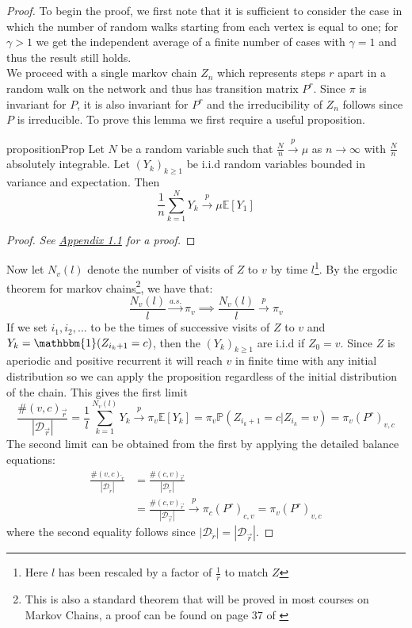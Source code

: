 \documentclass[a4paper]{article}
\renewcommand{\P}{\mathbb P}
\renewcommand{\E}{\mathbb E}
\newcommand{\D}{\mathcal D}
\newcommand{\rar}{\overrightarrow r}
\newcommand{\lar}{\overleftarrow r}
\begin{document}
\begin{proof}
To begin the proof, we first note that it is sufficient to consider the case in which the number
of random walks starting from each vertex is equal to one; for $\gamma > 1$ we get the independent average of
a finite number of cases with $\gamma = 1$ and thus the result still holds.\\
We proceed with a single markov chain $Z_n$ which represents steps $r$ apart
in a random walk on the network and thus has transition matrix $P^r$. Since $\pi$ is invariant for $P$, it is also invariant for $P^r$ and the irreducibility of $Z_n$
follows since $P$ is irreducible. To prove this lemma we first require a useful proposition.
\begin{restatable}{proposition}{Prop}
  Let $N$ be a random variable such that $\frac{N}{n} \overset{p}{\longrightarrow} \mu$ as $n \to \infty$ with $\frac{N}{n}$ absolutely integrable. Let $(Y_k)_{k \geq 1}$ be i.i.d random variables bounded in variance and expectation. Then
  \[\frac{1}{n}\sum_{k=1}^N Y_k \overset{p}{\longrightarrow} \mu\E[Y_1]\]
\end{restatable}
\begin{proof}\renewcommand{\qedsymbol}{}
  \textit{See \hyperref[sec:appendix]{Appendix 1.1} for a proof.}
\end{proof}
\noindent Now let $N_v(l)$ denote the number of visits of $Z$ to $v$ by time $l$\footnote{Here $l$ has been rescaled by a factor of $\frac{1}{r}$ to match $Z$}.
By the ergodic theorem for markov chains\footnote{This is also a standard theorem that will be proved in most courses on Markov Chains, a proof can be found on page 37 of \cite{markov_chains_alt}}, we have that:
\[\frac{N_v(l)}{l} \overset{a.s.}{\longrightarrow} \pi_v \implies \frac{N_v(l)}{l} \overset{p}{\longrightarrow} \pi_v\]
If we set $i_1, i_2, \dots$ to be the times of successive visits of $Z$ to $v$ and $Y_k = \mathbbm{1}(Z_{i_k+1} = c)$, then the $(Y_k)_{k \geq 1}$ are i.i.d if $Z_0 = v$. Since $Z$ is aperiodic and positive recurrent it will reach $v$ in finite time with any initial distribution so we can apply the proposition regardless of the initial distribution of the chain.
This gives the first limit
\[\frac{\#(v, c)_{\rar}}{|\D_{\rar}|} = \frac{1}{l}\sum_{k = 1}^{N_v(l)} Y_k \overset{p}{\longrightarrow} \pi_v \E[Y_k] = \pi_v\P(Z_{i_k + 1} = c | Z_{i_k} = v) = \pi_v(P^r)_{v,c}\]
The second limit can be obtained from the first by applying the detailed balance equations:
\begin{align*}
\frac{\#(v, c)_{\lar}}{|\D_{\lar}|} &= \frac{\#(c, v)_{\rar}}{|\D_{\lar}|}\\
&=\frac{\#(c, v)_{\rar}}{|\D_{\rar}|} \overset{p}{\longrightarrow} \pi_c(P^r)_{c,v} = \pi_v (P^r)_{v,c}
\end{align*}
where the second equality follows since $|\D_{\lar}| = |\D_{\rar}|$.
\end{proof}
\end{document}
